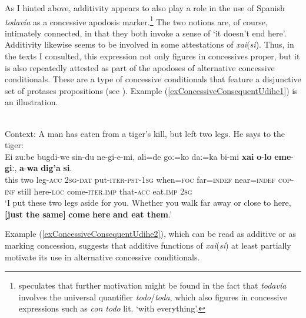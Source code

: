 As I hinted above, additivity appears to also play a role in the use of Spanish \textit{todavía} as a concessive apodosis marker.\footnote{\textcite{Bosque2016} speculates that further motivation might be found in the fact that \textit{todavía} involves the universal quantifier \textit{todo}/\textit{toda}, which also figures in concessive expressions such as \textit{con todo} lit. \lq{}with everything\rq{}.} The two notions are, of course, intimately connected, in that they both invoke a sense of \lq it doesn't end here\rq{}. Additivity likewise seems to be involved in some attestations of  \mbox{\textit{xai}(\textit{si})}. Thus, in the texts I consulted, this expression not only figures in concessives proper, but it is also repeatedly attested as part of the apodoses of alternative concessive conditionals. These are a type of concessive conditionals that feature a disjunctive set of protases propositions (see \cite{HaspelmathKoenig1998}). Example (\ref{exConcessiveConsequentUdihe1}) is an illustration.

\begin{exe}
	\ex {}\label{exConcessiveConsequentUdihe1}\\
	Context: A man has eaten from a tiger’s kill, but left two legs. He says to the tiger:\\
	\gll Ei zuːbe bugdi-we sin-du ne-gi-e-mi, ali=de goː=ko daː=ka bi-mi \textbf{xai} \textbf{o}-\textbf{lo} \textbf{eme}-\textbf{giː}, \textbf{a}-\textbf{wa} \textbf{dig’a} \textbf{si}.\\
	this two leg-\textsc{acc} 2\textsc{sg}-\textsc{dat} put-\textsc{iter}-\textsc{pst}-1\textsc{sg} when=\textsc{foc} far=\textsc{indef} near=\textsc{indef} \textsc{cop}-\textsc{inf} still here-\textsc{loc} come-\textsc{iter}.\textsc{imp} that-\textsc{acc} eat.\textsc{imp} 2\textsc{sg}\\
	\glt \lq I put these two legs aside for you. Whether you walk far away or close to here, \textbf{[just the same]} \textbf{come} \textbf{here} \textbf{and eat them}.\rq
	\\\parencite[The tiger for Udihe people]{NikolaevaEtAl2019}	
\end{exe} 

Example (\ref{exConcessiveConsequentUdihe2}), which can be read as additive or as marking concession, suggests that additive functions of \mbox{\textit{xai}(\textit{si})} at least partially motivate its use in alternative concessive conditionals.

